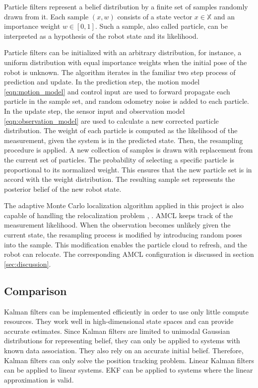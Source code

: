 \documentclass[10pt,journal,compsoc]{IEEEtran}
\begin{document}
Particle filters represent a belief distribution by a finite set of samples randomly drawn from it. Each sample $(x, w)$ consists of a state vector $x \in \mathbb{X}$ and an importance weight $w \in [0,1]$. Such a sample, also called particle, can be interpreted as a hypothesis of the robot state and its likelihood. 

Particle filters can be initialized with an arbitrary distribution, for instance, a uniform distribution with equal importance weights when the initial pose of the robot is unknown. The algorithm iterates in the familiar two step process of prediction and update. In the prediction step, the motion model \ref{eqn:motion_model} and control input are used to forward propagate each particle in the sample set, and random odometry noise is added to each particle. In the update step, the sensor input and observation model \ref{eqn:observation_model} are used to calculate a new corrected particle distribution. The weight of each particle is computed as the likelihood of the measurement, given the system is in the predicted state. Then, the resampling procedure is applied. A new collection of samples is drawn with replacement from the current set of particles. The probability of selecting a specific particle is proportional to its normalized weight. This ensures that the new particle set is in accord with the weight distribution. The resulting sample set represents the posterior belief of the new robot state.

The adaptive Monte Carlo localization algorithm applied in this project is also capable of handling the relocalization problem \cite{probabilistic_robotics}, \cite{ros_wiki_amcl}. AMCL keeps track of the measurement likelihood. When the observation becomes unlikely given the current state, the resampling process is modified by introducing random poses into the sample. This modification enables the particle cloud to refresh, and the robot can relocate. The corresponding AMCL configuration is discussed in section \ref{sec:discussion}.

\subsection{Comparison}
Kalman filters can be implemented efficiently in order to use only little compute resources. They work well in high-dimensional state spaces and can provide accurate estimates. Since Kalman filters are limited to unimodal Gaussian distributions for representing belief, they can only be applied to systems with known data association. They also rely on an accurate initial belief. Therefore, Kalman filters can only solve the position tracking problem. Linear Kalman filters can be applied to linear systems. EKF can be applied to systems where the linear approximation is valid.
\end{document}
